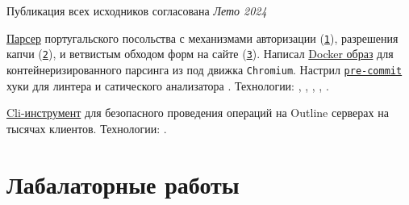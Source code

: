 \documentclass[margin,line]{resume}
\begin{document}
\begin{resume}
\begin{description}
\begin{list2}
        \vspace{2mm}

      \end{list2}
    \item[Дрегие проекты]\small{
        \begingroup
        \textcolor{gray!60}{Публикация всех исходников согласована}
        \endgroup
      }{\hfill
      \textsl{Лето 2024}}\vspace{2mm}
      \begin{list2}

      \item{
          \href{https://github.com/alchemmist/portu-hack}{Парсер}
          португальского посольства с механизмами авторизации
          (\href{https://github.com/alchemmist/portu-hack/blob/develop/parser/parser/searcher/auth.py}{\texttt{1}}),
          разрешения капчи
          (\href{https://github.com/alchemmist/portu-hack/blob/develop/parser/parser/searcher/captcha.py}{\texttt{2}}),
          и
          ветвистым обходом форм на сайте
          (\href{https://github.com/alchemmist/portu-hack/blob/develop/parser/parser/searcher/snif.py}{\texttt{3}}).
          Написал
          \href{https://github.com/alchemmist/portu-hack/blob/develop/parser/Dockerfile}{Docker
          образ} для контейнеризированного парсинга
           из под движка \texttt{Chromium}.
          Настрил
          \href{https://github.com/alchemmist/portu-hack/blob/develop/pre-commit-config.yaml}{\texttt{pre-commit}}
          хуки для линтера
           и сатического анализатора .
          Технологии: , ,
          ,
          ,
        .}

        \vspace{2mm}

      \item{
          \href{https://github.com/alchemmist/outline-vpn-cli}{Cli-инструмент}
          для безопасного проведения операций на
          Outline серверах на тысячах клиентов.
        Технологии: .}
      \end{list2}

  \end{description}

  \section{\mysidestyle Лабалаторные работы}\vspace{2mm}


\end{resume}
\end{document}
